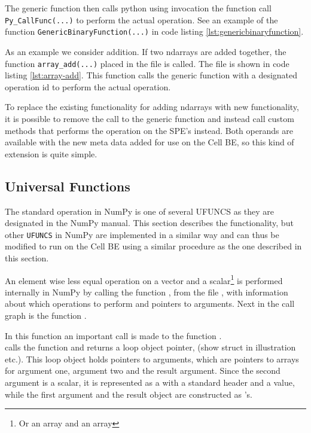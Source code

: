 The generic function then calls python using invocation the function call \texttt{Py\_CallFunc(...)} to
perform the actual operation. See an example of the function \texttt{GenericBinaryFunction(...)} in code listing \ref{lst:genericbinaryfunction}.


As an example we consider addition. If two ndarrays are added
together, the function \texttt{array\_add(...)} placed in the
file  is called. The file is shown in code
listing \ref{lst:array-add}. This function calls the generic function
with a designated operation id to perform the actual operation.

To replace the existing functionality for adding ndarrays with new
functionality, it is possible to remove the call to the generic
function and instead call custom methods that performs the operation
on the SPE's instead. Both operands are available with the new meta
data added for use on the Cell BE, so this kind of extension is quite
simple.


\subsection{Universal Functions}

The standard  operation in NumPy is one of
several UFUNCS as they are designated in the NumPy manual. This
section describes the  functionality, but
other \texttt{UFUNCS} in NumPy are implemented in a similar way and
can thus be modified to run on the Cell BE using a similar procedure
as the one described in this section.

An element wise less equal operation on a vector and a
scalar\footnote{Or an array and an array} is performed internally in
NumPy by calling the function ,
from the file , with information about which
operations to perform and pointers to arguments. Next in the call
graph is the function .

In this function an important call is made to the function .\\
 calls the function 
 and returns a loop object pointer,  (show
struct in illustration etc.). This loop object holds pointers to
arguments, which are pointers to arrays for argument one, argument two
and the result argument. Since the second argument is a scalar, it is
represented as a  with a standard header and a value,
while the first argument and the result object are constructed as
's.


